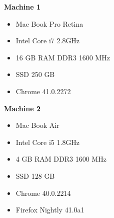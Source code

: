 \textbf{Machine 1}
\begin{itemize}
  \item Mac Book Pro Retina
  \item Intel Core i7 2.8GHz
  \item 16 GB RAM DDR3 1600 MHz
  \item SSD 250 GB
  \item Chrome 41.0.2272
\end{itemize}

\textbf{Machine 2}
\begin{itemize}
  \item Mac Book Air
  \item Intel Core i5 1.8GHz
  \item 4 GB RAM DDR3 1600 MHz
  \item SSD 128 GB
  \item Chrome 40.0.2214
  \item Firefox Nightly 41.0a1
\end{itemize}


\pagebreak